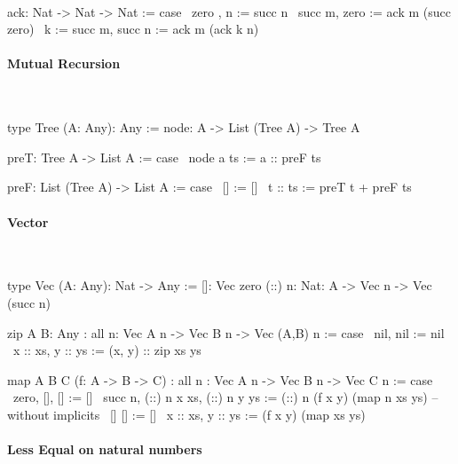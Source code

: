 \ \begin{alba}
    ack: Nat -> Nat -> Nat := case
        \ zero  ,      n      :=  succ n
        \ succ m,      zero   :=  ack m (succ zero)
        \ k := succ m, succ n :=  ack m (ack k n)
\end{alba}









\paragraph{Mutual Recursion}

\ \begin{alba}
    type Tree (A: Any): Any :=
        node: A -> List (Tree A) -> Tree A

    preT: Tree A -> List A := case
        \ node a ts := a :: preF ts

    preF: List (Tree A) -> List A := case
        \ []         :=  []
        \ t :: ts    :=  preT t + preF ts
\end{alba}






\paragraph{Vector}

\ \begin{alba}
    type Vec (A: Any): Nat -> Any :=
        []:  Vec zero
        (::) {n: Nat}: A -> Vec n -> Vec (succ n)

    zip {A B: Any}
    : all {n}: Vec A n -> Vec B n -> Vec (A,B) n
    := case
        \ nil,     nil     := nil
        \ x :: xs, y :: ys := (x, y) :: zip xs ys
\end{alba}

\begin{alba}
    map {A B C} (f: A -> B -> C)
        : all {n}
          : Vec A n -> Vec B n -> Vec C n
    := case
        \ {zero},   [],            [] :=
            []
        \ {succ n}, (::) {n} x xs, (::) {n} y ys :=
            (::) {n} (f x y) (map {n} xs ys)
        -- without implicits
        \ [] []            := []
        \ x :: xs, y :: ys := (f x y) (map xs ys)
\end{alba}





\paragraph{Less Equal on natural numbers}


